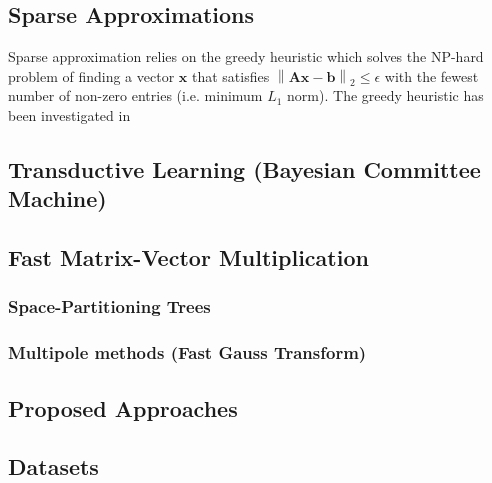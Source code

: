 \documentclass{article}
\begin{document}
\subsection{Sparse Approximations}
Sparse approximation relies on the greedy heuristic which solves the NP-hard problem of finding a vector $\mathbf{x}$ that satisfies $\left \| \mathbf{A}\mathbf{x} -\mathbf{b} \right \|_2\leq \epsilon $ with the fewest number of non-zero entries (i.e. minimum $L_1$ norm). The greedy heuristic has been investigated in \cite{natarajan}

\subsection{Transductive Learning (Bayesian Committee Machine)}

\subsection{Fast Matrix-Vector Multiplication}

\subsubsection{Space-Partitioning Trees}
\subsubsection{Multipole methods (Fast Gauss Transform)}

\subsection{Proposed Approaches}

\subsection{Datasets}

\newpage


\end{document}
